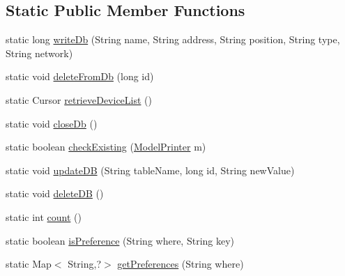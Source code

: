 \subsection*{Static Public Member Functions}
\begin{DoxyCompactItemize}
\item 
static long \hyperlink{classandroid_1_1app_1_1printerapp_1_1devices_1_1database_1_1_database_controller_ae7ce22886c85d7ebdccca071185191e1}{write\+Db} (String name, String address, String position, String type, String network)
\item 
static void \hyperlink{classandroid_1_1app_1_1printerapp_1_1devices_1_1database_1_1_database_controller_a769bc5f5aab852ff640cb142da3c9a6d}{delete\+From\+Db} (long id)
\item 
static Cursor \hyperlink{classandroid_1_1app_1_1printerapp_1_1devices_1_1database_1_1_database_controller_ae20eed9cadddc80946decbfbac523f11}{retrieve\+Device\+List} ()
\item 
static void \hyperlink{classandroid_1_1app_1_1printerapp_1_1devices_1_1database_1_1_database_controller_abce1096f0860ff85ba80c73ddb85430d}{close\+Db} ()
\item 
static boolean \hyperlink{classandroid_1_1app_1_1printerapp_1_1devices_1_1database_1_1_database_controller_a4f4cf38bc553eea36c89958d3e0100f1}{check\+Existing} (\hyperlink{classandroid_1_1app_1_1printerapp_1_1model_1_1_model_printer}{Model\+Printer} m)
\item 
static void \hyperlink{classandroid_1_1app_1_1printerapp_1_1devices_1_1database_1_1_database_controller_a42981bb9f2ef7ecac10ec70e44b9c650}{update\+DB} (String table\+Name, long id, String new\+Value)
\item 
static void \hyperlink{classandroid_1_1app_1_1printerapp_1_1devices_1_1database_1_1_database_controller_a160c134dde02fa4a4317b76fc7dff08d}{delete\+DB} ()
\item 
static int \hyperlink{classandroid_1_1app_1_1printerapp_1_1devices_1_1database_1_1_database_controller_a7f668adca007ca3f0a0cb9cddb824a25}{count} ()
\item 
static boolean \hyperlink{classandroid_1_1app_1_1printerapp_1_1devices_1_1database_1_1_database_controller_a552da36ba7e318f435da9cef4bccb069}{is\+Preference} (String where, String key)
\item 
static Map$<$ String,?$>$ \hyperlink{classandroid_1_1app_1_1printerapp_1_1devices_1_1database_1_1_database_controller_a0c08a97c324d53a3335affa24decea48}{get\+Preferences} (String where)
\item 

\end{DoxyCompactItemize}

